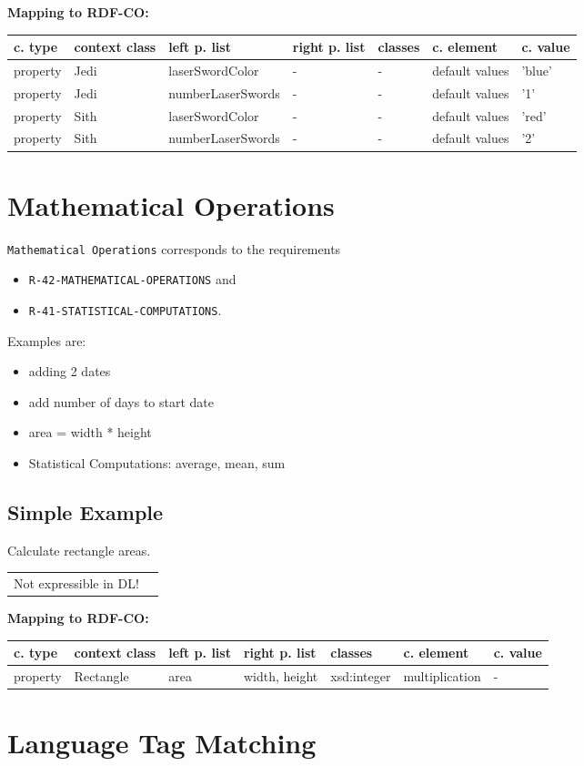 \documentclass{llncs}
\newcommand{\ms}[1]{\texttt{#1}}
\newenvironment{gcotable}{
  \scriptsize
  \sffamily
  \vspace{0cm}
	\begin{center}
	\textbf{\vspace{0.4cm}Mapping to RDF-CO:} \\
  \begin{tabular}{l|l|l|l|l|l|l}
	\hline
  \textbf{c. type} & \textbf{context class} & \textbf{left p. list} & \textbf{right p. list} & \textbf{classes} & \textbf{c. element} & \textbf{c. value} \\
  \hline

}{
  \hline
  \end{tabular}
	\end{center}
}
\newenvironment{DL}{
  \vspace{0cm}
	\begin{center}
  \begin{tabular}{r l}

}{
  \end{tabular}
	\end{center}
}
\begin{document}
\begin{gcotable}
property & Jedi & laserSwordColor & - & - & default values & 'blue' \\
property & Jedi & numberLaserSwords & - & - & default values & '1' \\
property & Sith & laserSwordColor & - & - & default values & 'red' \\
property & Sith & numberLaserSwords & - & - & default values & '2' \\
\end{gcotable}

\section{Mathematical Operations}

\ms{Mathematical Operations} corresponds to the requirements
\begin{itemize}
	\item \ms{R-42-MATHEMATICAL-OPERATIONS} and
  \item \ms{R-41-STATISTICAL-COMPUTATIONS}.
\end{itemize}
Examples are:
\begin{itemize}
	\item adding 2 dates
	\item add number of days to start date
	\item area = width * height
	\item Statistical Computations: average, mean, sum
\end{itemize}

\subsection{Simple Example}

Calculate rectangle areas.

\begin{DL}
Not expressible in DL!
\end{DL}

\begin{gcotable}
property & Rectangle & area & width, height & xsd:integer & multiplication & - \\
\end{gcotable}

\section{Language Tag Matching}
\end{document}
